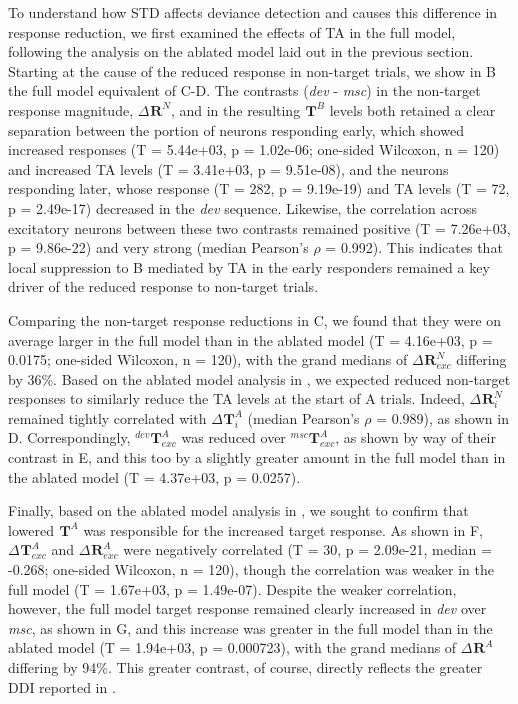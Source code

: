 \documentclass[9pt,lineno,onehalfspacing]{elife}
\newcommand{\dev}{\textit{dev}}
\newcommand{\msc}{\textit{msc}}
\newcommand{\R}[3][]{{}^{#1}_{}\boldsymbol R^{#2}_{#3}}
\newcommand{\T}[3][]{{}^{#1}_{}\boldsymbol T^{#2}_{#3}}
\begin{document}
To understand how STD affects deviance detection and causes this difference in response reduction, we first examined the effects of TA in the full model, following the analysis on the ablated model laid out in the previous section. Starting at the cause of the reduced response in non-target trials, we show in B the full model equivalent of C-D. The contrasts (\dev{} - \msc{}) in the non-target response magnitude, $\Delta \R{N}{}$, and in the resulting $\T{B}{}$ levels both retained a clear separation between the portion of neurons responding early, which showed increased responses (T = 5.44e+03, p = 1.02e-06; one-sided Wilcoxon, n = 120) and increased TA levels (T = 3.41e+03, p = 9.51e-08), and the neurons responding later, whose response (T = 282, p = 9.19e-19) and TA levels (T = 72, p = 2.49e-17) decreased in the \dev{} sequence. Likewise, the correlation across excitatory neurons between these two contrasts remained positive (T = 7.26e+03, p = 9.86e-22) and very strong (median Pearson's $\rho$ = 0.992). This indicates that local suppression to B mediated by TA in the early responders remained a key driver of the reduced response to non-target trials.

Comparing the non-target response reductions in C, we found that they were on average larger in the full model than in the ablated model (T = 4.16e+03, p = 0.0175; one-sided Wilcoxon, n = 120), with the grand medians of $\Delta \R{N}{exc}$ differing by 36\%. Based on the ablated model analysis in , we expected reduced non-target responses to similarly reduce the TA levels at the start of A trials. Indeed, $\Delta \R{N}{i}$ remained tightly correlated with $\Delta \T{A}{i}$ (median Pearson's $\rho$ = 0.989), as shown in D. Correspondingly, $\T[dev]{A}{exc}$ was reduced over $\T[msc]{A}{exc}$, as shown by way of their contrast in E, and this too by a slightly greater amount in the full model than in the ablated model (T = 4.37e+03, p = 0.0257).

Finally, based on the ablated model analysis in , we sought to confirm that lowered $\T{A}{}$ was responsible for the increased target response. As shown in F, $\Delta \T{A}{exc}$ and $\Delta \R{A}{exc}$ were negatively correlated (T = 30, p = 2.09e-21, median = -0.268; one-sided Wilcoxon, n = 120), though the correlation was weaker in the full model (T = 1.67e+03, p = 1.49e-07). Despite the weaker correlation, however, the full model target response remained clearly increased in \dev{} over \msc{}, as shown in G, and this increase was greater in the full model than in the ablated model (T = 1.94e+03, p = 0.000723), with the grand medians of $\Delta \R{A}{}$ differing by 94\%. This greater contrast, of course, directly reflects the greater DDI reported in .
\end{document}
